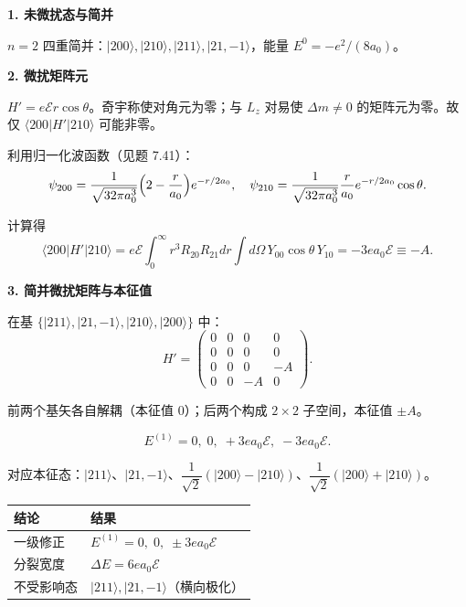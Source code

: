 \begin{derivationbox}[标准解题过程]
\textbf{1. 未微扰态与简并}

$n=2$ 四重简并：$|200\rangle,|210\rangle,|211\rangle,|21,-1\rangle$，能量 $E^0=-e^2/(8a_0)$。

\textbf{2. 微扰矩阵元}

$H'=e\mathcal{E}r\cos\theta$。奇宇称使对角元为零；与 $L_z$ 对易使 $\Delta m\neq0$ 的矩阵元为零。故仅 $\langle200|H'|210\rangle$ 可能非零。

利用归一化波函数（见题 7.41）：
\[
\psi_{200}=\frac{1}{\sqrt{32\pi a_0^3}}\Bigl(2-\frac{r}{a_0}\Bigr)e^{-r/2a_0},\quad
\psi_{210}=\frac{1}{\sqrt{32\pi a_0^3}}\frac{r}{a_0}e^{-r/2a_0}\cos\theta.
\]

计算得
\[
\langle200|H'|210\rangle=e\mathcal{E}\int_0^\infty\!r^3R_{20}R_{21}dr\int d\Omega\,Y_{00}\cos\theta\,Y_{10}=-3ea_0\mathcal{E}\equiv-A.
\]

\textbf{3. 简并微扰矩阵与本征值}

在基 $\{|211\rangle,|21,-1\rangle,|210\rangle,|200\rangle\}$ 中：
\[
H'=\begin{pmatrix}0&0&0&0\\0&0&0&0\\0&0&0&-A\\0&0&-A&0\end{pmatrix}.
\]

前两个基矢各自解耦（本征值 $0$）；后两个构成 $2\times2$ 子空间，本征值 $\pm A$。

\begin{equation}
\boxed{E^{(1)}=0,\;0,\;+3ea_0\mathcal{E},\;-3ea_0\mathcal{E}.}
\end{equation}

对应本征态：$|211\rangle$、$|21,-1\rangle$、$\dfrac{1}{\sqrt2}(|200\rangle-|210\rangle)$、$\dfrac{1}{\sqrt2}(|200\rangle+|210\rangle)$。
\end{derivationbox}

\begin{formulabox}[答案汇总]
\begin{center}
\begin{tabular}{ll}
\toprule
\textbf{结论} & \textbf{结果} \\
\midrule
一级修正 & $E^{(1)}=0,\;0,\;\pm3ea_0\mathcal{E}$ \\
分裂宽度 & $\Delta E=6ea_0\mathcal{E}$ \\
不受影响态 & $|211\rangle,|21,-1\rangle$（横向极化） \\
\bottomrule
\end{tabular}
\end{center}
\end{formulabox}

